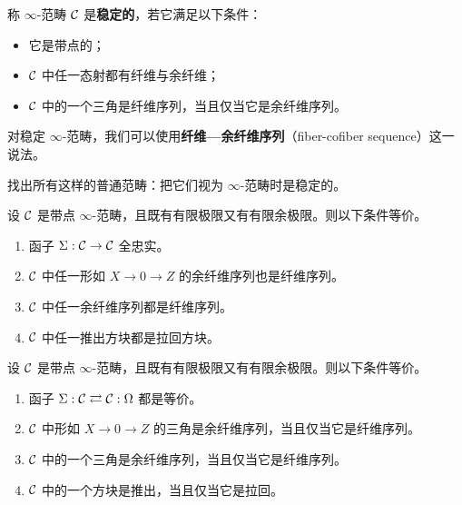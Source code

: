 \begin{definition}\label{L15-1.5}
称 $\infty$-范畴 $\mathcal{C}$ 是\textbf{稳定的}，若它满足以下条件：
\begin{itemize}[leftmargin=2.2em,itemsep=0.1em]
\item 它是带点的；
\item $\mathcal{C}$ 中任一态射都有纤维与余纤维；
\item $\mathcal{C}$ 中的一个三角是纤维序列，当且仅当它是余纤维序列。
\end{itemize}
\end{definition}

\nitem\label{L15-1.6} 对稳定 $\infty$-范畴，我们可以使用\textbf{纤维—余纤维序列}（fiber-cofiber sequence）这一说法。

\begin{exercise}\label{L15-1.7}
找出所有这样的普通范畴：把它们视为 $\infty$-范畴时是稳定的。
\end{exercise}

\begin{proposition}\label{L15-1.8}
设 $\mathcal{C}$ 是带点 $\infty$-范畴，且既有有限极限又有有限余极限。则以下条件等价。
\begin{enumerate}[label=(\roman*),leftmargin=2.4em,itemsep=0.1em]
\item 函子 $\Sigma:\mathcal{C}\to\mathcal{C}$ 全忠实。
\item $\mathcal{C}$ 中任一形如 $X\to 0\to Z$ 的余纤维序列也是纤维序列。
\item $\mathcal{C}$ 中任一余纤维序列都是纤维序列。
\item $\mathcal{C}$ 中任一推出方块都是拉回方块。
\end{enumerate}
\end{proposition}

\begin{corollary}\label{L15-1.9}
设 $\mathcal{C}$ 是带点 $\infty$-范畴，且既有有限极限又有有限余极限。则以下条件等价。
\begin{enumerate}[label=(\roman*),leftmargin=2.4em,itemsep=0.1em]
\item 函子 $\Sigma:\mathcal{C}\rightleftarrows\mathcal{C}:\Omega$ 都是等价。
\item $\mathcal{C}$ 中形如 $X\to 0\to Z$ 的三角是余纤维序列，当且仅当它是纤维序列。
\item $\mathcal{C}$ 中的一个三角是余纤维序列，当且仅当它是纤维序列。
\item $\mathcal{C}$ 中的一个方块是推出，当且仅当它是拉回。
\end{enumerate}
\end{corollary}

